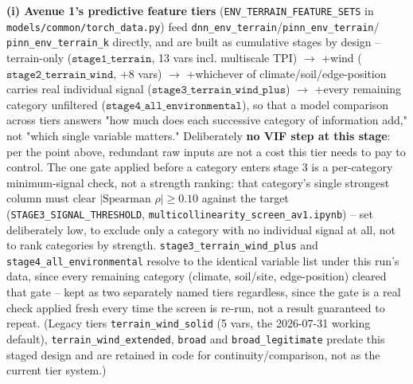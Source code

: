 \documentclass[11pt,a4paper]{report}
\begin{document}
\textbf{(i) Avenue 1's predictive feature tiers} (\texttt{ENV\_TERRAIN\_FEATURE\_SETS} in
\texttt{models/common/torch\_data.py}) feed \texttt{dnn\_env\_terrain}/\texttt{pinn\_env\_terrain}/
\texttt{pinn\_env\_terrain\_k} directly, and are built as cumulative stages by design --
terrain-only ($\texttt{stage1\_terrain}$, 13 vars incl. multiscale TPI) $\to$ +wind
($\texttt{stage2\_terrain\_wind}$, +8 vars) $\to$ +whichever of climate/soil/edge-position carries
real individual signal ($\texttt{stage3\_terrain\_wind\_plus}$) $\to$ +every remaining category
unfiltered ($\texttt{stage4\_all\_environmental}$), so that a model comparison across tiers
answers "how much does each successive category of information add," not "which single variable
matters." Deliberately \textbf{no VIF step at this stage}: per the point above, redundant raw
inputs are not a cost this tier needs to pay to control. The one gate applied before a category
enters stage 3 is a per-category minimum-signal check, not a strength ranking: that category's
single strongest column must clear $|\text{Spearman }\rho|\ge 0.10$ against the target
(\texttt{STAGE3\_SIGNAL\_THRESHOLD}, \texttt{multicollinearity\_screen\_av1.ipynb}) -- set
deliberately low, to exclude only a category with no individual signal at all, not to rank
categories by strength. \texttt{stage3\_terrain\_wind\_plus} and \texttt{stage4\_all\_environmental}
resolve to the identical variable list under this run's data, since every remaining category
(climate, soil/site, edge-position) cleared that gate -- kept as two separately named tiers
regardless, since the gate is a real check applied fresh every time the screen is re-run, not a
result guaranteed to repeat.
(Legacy tiers \texttt{terrain\_wind\_solid} (5 vars, the 2026-07-31 working default),
\texttt{terrain\_wind\_extended}, \texttt{broad} and \texttt{broad\_legitimate} predate this
staged design and are retained in code for continuity/comparison, not as the current tier
system.)
\end{document}
